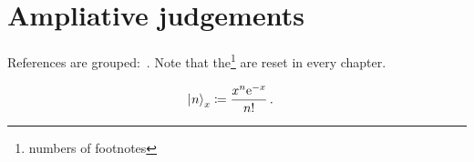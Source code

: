 \chapter{Ampliative judgements}\label{ch:2_chapter}


References are grouped:~\cite{Heidegger:1410,Nietzsche:2014,Adorno:2014,Schumpeter:2015,Schopenhauer:2009,Feuerbach:1949,Wittgenstein:2015,Popper:2008,Carnap:2004}.
%
Note that the\footnote{numbers of footnotes} are reset in every chapter.
%
\kant[12]

%
\begin{align}
	&\ketA{n}_{x} 			\label{eq:equation_X}  
		\coloneqq \frac{x^n \ee^{-x}}{n!} 		\,.
\end{align}
%

\kant[2-3]
	
